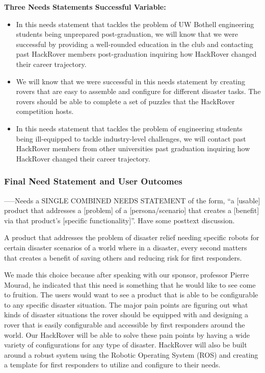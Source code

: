 \documentclass[a4paper, 10pt]{article}
\begin{document}
			\textbf{Three Needs Statements Successful Variable:}
			\begin{itemize}
				\item
				In this needs statement that tackles the problem of UW Bothell engineering students being unprepared post-graduation, we will know that we were successful by providing a well-rounded education in the club and contacting past HackRover members post-graduation inquiring how HackRover changed their career trajectory.

				\item
				We will know that we were successful in this needs statement by creating rovers that are easy to assemble and configure for different disaster tasks. The rovers should be able to complete a set of puzzles that the HackRover competition hosts.

				\item
				In this needs statement that tackles the problem of engineering students being ill-equipped to tackle industry-level challenges, we will contact past HackRover members from other universities past graduation inquiring how HackRover changed their career trajectory. 
			\end{itemize}

		\subsubsection{Final Need Statement and User Outcomes}
		-----Needs a SINGLE COMBINED NEEDS STATEMENT of the form, “a [usable] product that addresses a [problem] of a [persona/scenario] that creates a [benefit] via that product’s [specific functionality]”. Have some posttext discussion.
		
		A product that addresses the problem of disaster relief needing specific robots for certain disaster scenarios of a world where in a disaster, every second matters that creates a benefit of saving others and reducing risk for first responders.

We made this choice because after speaking with our sponsor, professor Pierre Mourad, he indicated that this need is something that he would like to see come to fruition. The users would want to see a product that is able to be configurable to any specific disaster situation. The major pain points are figuring out what kinds of disaster situations the rover should be equipped with and designing a rover that is easily configurable and accessible by first responders around the world. Our HackRover will be able to solve these pain points by having a wide variety of configurations for any type of disaster. HackRover will also be built around a robust system using the Robotic Operating System (ROS) and creating a template for first responders to utilize and configure to their needs.
\end{document}
